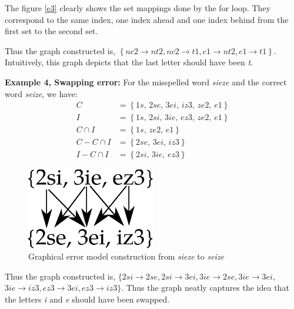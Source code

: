 	The figure \ref{e3} clearly shows the set mappings done by the for loop. They correspond to the same index, one index ahead and one index behind from the first set to the second set.
	
	Thus the graph constructed is, $\left\lbrace \textit{nc2} \rightarrow  \textit{nt2}, \textit{nc2} \rightarrow  \textit{t1}, \textit{c1} \rightarrow  \textit{nt2}, \textit{c1} \rightarrow  \textit{t1} \right\rbrace$.
	Intuitively, this graph depicts that the last letter should have been \textit{t}.
	
	\textbf{Example 4, Swapping error:} For the misspelled word \textit{sieze} and the correct word \textit{seize}, we have:
	\begin{equation*}
	\begin{aligned}
	C &= \left\lbrace \textit{1s, 2se, 3ei, iz3, ze2, e1} \right\rbrace \\
	I &= \left\lbrace \textit{1s, 2si, 3ie, ez3, ze2, e1} \right\rbrace \\
	C \cap I &= \left\lbrace \textit{1s, ze2, e1} \right\rbrace \\
	C - C \cap I &= \left\lbrace \textit{2se, 3ei, iz3} \right\rbrace \\
	I - C \cap I &= \left\lbrace \textit{2si, 3ie, ez3} \right\rbrace
	\end{aligned}
	\end{equation*}
	\begin{figure}[h]
		\centering
		\includegraphics[width=0.5\textwidth]{gfx/ex4.pdf}
		\caption{Graphical error model construction from \textit{sieze} to \textit{seize}}
		\label{e4}
	\end{figure}
	
	Thus the graph constructed is, $\lbrace \textit{2si} \rightarrow  \textit{2se}, \textit{2si} \rightarrow  \textit{3ei}, \textit{3ie} \rightarrow  \textit{2se}, \textit{3ie} \rightarrow  \textit{3ei},$ $ \textit{3ie} \rightarrow  \textit{iz3}, \textit{ez3} \rightarrow  \textit{3ei}, \textit{ez3} \rightarrow  \textit{iz3} \rbrace$.
	Thus the graph neatly captures the idea that the letters \textit{i} and \textit{e} should have been swapped.
	
